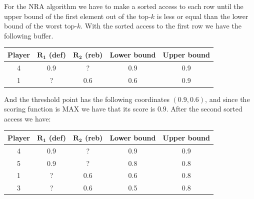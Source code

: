 \documentclass[12pt, a4paper]{report}
\newtheorem[style=M,bodystyle=\normalfont]{theorem}{Theorem}
\newtheorem[style=M,bodystyle=\normalfont]{corollary}{Corollary}
\newtheorem[style=M,bodystyle=\normalfont]{lemma}{Lemma}
\newtheorem[style=M,bodystyle=\normalfont]{definition}{Definition}
\begin{document}
\begin{enumerate}
            For the NRA algorithm we have to make a sorted access to each row until the upper bound of the first element out of the top-$k$ is less
            or equal than the lower bound of the worst top-$k$. With the sorted access to the first row we have the following buffer. 
            \begin{table}[H]
                \centering
                \begin{tabular}{c|cc|cc}
                \hline
                \textbf{Player} & \textbf{$\boldsymbol{R_1}$ (def)} & \textbf{$\boldsymbol{R_2}$ (reb)} & \textbf{Lower bound} & \textbf{Upper bound} \\ \hline
                4               & 0.9                               & ?                                 & 0.9                  & 0.9                  \\
                1               & ?                                 & 0.6                               & 0.6                  & 0.9                  \\ \hline
                \end{tabular}
            \end{table}
            And the threshold point has the following coordinates $(0.9,0.6)$, and since the scoring function is MAX we have that its score is $0.9$.
            After the second sorted access we have: 
            \begin{table}[H]
                \centering
                \begin{tabular}{c|cc|cc}
                \hline
                \textbf{Player} & \textbf{$\boldsymbol{R_1}$ (def)} & \textbf{$\boldsymbol{R_2}$ (reb)} & \textbf{Lower bound} & \textbf{Upper bound} \\ \hline
                4               & 0.9                               & ?                                 & 0.9                  & 0.9                  \\
                5               & 0.9                               & ?                                 & 0.8                  & 0.8                  \\
                1               & ?                                 & 0.6                               & 0.6                  & 0.8                  \\
                3               & ?                                 & 0.6                               & 0.5                  & 0.8                  \\ \hline
                \end{tabular}

\end{table}
\end{enumerate}
\end{document}
